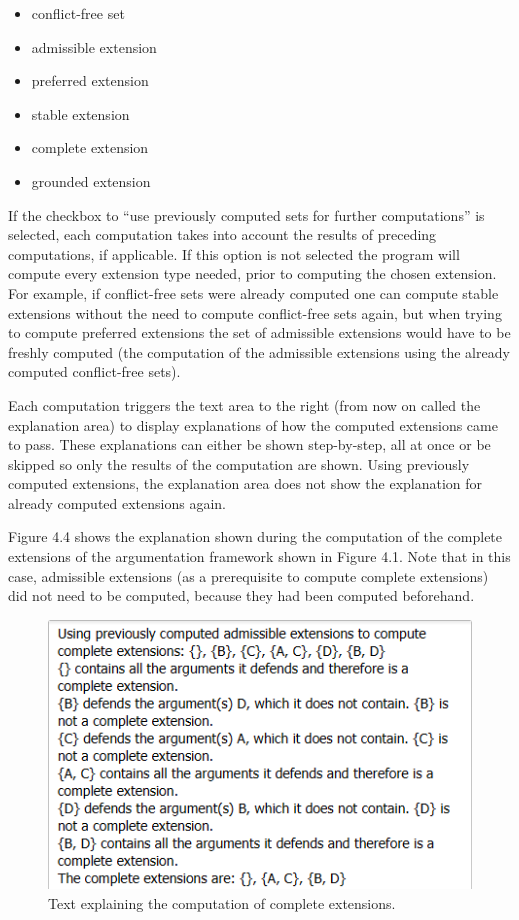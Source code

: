 \documentclass[draft,final]{vutinfth} %
\newcommand{\hl}{\par\vspace{6pt}} %
\begin{document}
\begin{itemize}[noitemsep]
	\item conflict-free set
	\item admissible extension
	\item preferred extension
	\item stable extension
	\item complete extension
	\item grounded extension
\end{itemize}

If the checkbox to ``use previously computed sets for further computations'' is selected, each computation takes into account the results of preceding computations, if applicable. If this option is not selected the program will compute every extension type needed, prior to computing the chosen extension.\\
For example, if conflict-free sets were already computed one can compute stable extensions without the need to compute conflict-free sets again, but when trying to compute preferred extensions the set of admissible extensions would have to be freshly computed (the computation of the admissible extensions using the already computed conflict-free sets).\hl
Each computation triggers the text area to the right (from now on called the explanation area) to display explanations of how the computed extensions came to pass. These explanations can either be shown step-by-step, all at once or be skipped so only the results of the computation are shown. Using previously computed extensions, the explanation area does not show the explanation for already computed extensions again.\hl
Figure 4.4 shows the explanation shown during the computation of the complete extensions of the argumentation framework shown in Figure 4.1. Note that in this case, admissible extensions (as a prerequisite to compute complete extensions) did not need to be computed, because they had been computed beforehand.

\FloatBarrier
	\begin{figure}[!h]
		\centering
		\includegraphics[scale=0.9]{pics/steps.png}
		\caption{Text explaining the computation of complete extensions.}
	\end{figure}
\FloatBarrier
\end{document}
